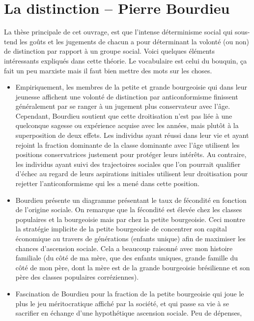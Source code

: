 \section{La distinction -- Pierre Bourdieu}

La thèse principale de cet ouvrage, est que l'intense déterminisme social qui
sous-tend les goûts et les jugements de chacun a pour déterminant la volonté
(ou non) de distinction par rapport à un groupe social.
Voici quelques éléments intéressants expliqués dans cette théorie. Le vocabulaire
est celui du bouquin, ça fait un peu marxiste mais il faut bien mettre des mots
sur les choses.

\begin{itemize}
  \item Empiriquement, les membres de la petite et grande bourgeoisie qui dans
  leur jeunesse affichent une volonté de distinction par anticonformisme
  finissent généralement par se ranger à un jugement plus conservateur avec
  l'âge. Cependant, Bourdieu soutient que cette droitisation n'est pas liée à
  une quelconque sagesse ou expérience acquise avec les années, mais plutôt à
  la superposition de deux effets. Les individus ayant réussi dans leur vie et
  ayant rejoint la fraction dominante de la classe dominante avec l'âge utilisent
  les positions conservatrices justement pour protéger leurs intérêts. Au
  contraire, les individus ayant suivi des trajectoires sociales que l'on
  pourrait qualifier d'échec au regard de leurs aspirations initiales utilisent
  leur droitisation pour rejetter l'anticonformisme qui les a mené dans cette
  position.
  \item Bourdieu présente un diagramme présentant le taux de fécondité en
  fonction de l'origine sociale. On remarque que la fécondité est élevée chez
  les classes populaires et la bourgeoisie mais par chez la petite bourgeoisie.
  Ceci montre la stratégie implicite de la petite bourgeoisie de concentrer son
  capital économique au travers de générations (enfants unique) afin de maximiser
  les chances d'ascension sociale. Cela a beaucoup raisonné avec mon histoire
  familiale (du côté de ma mère, que des enfants uniques, grande famille du côté
  de mon père, dont la mère est de la grande bourgeoisie brésilienne et son père
  des classes populaires corréziennes).
  \item Fascination de Bourdieu pour la fraction de la petite bourgeoisie qui
  joue le plus le jeu méritocratique affiché par la société, et qui passe sa vie
  à se sacrifier en échange d'une hypothétique ascension sociale. Peu de dépenses,

\end{itemize}
